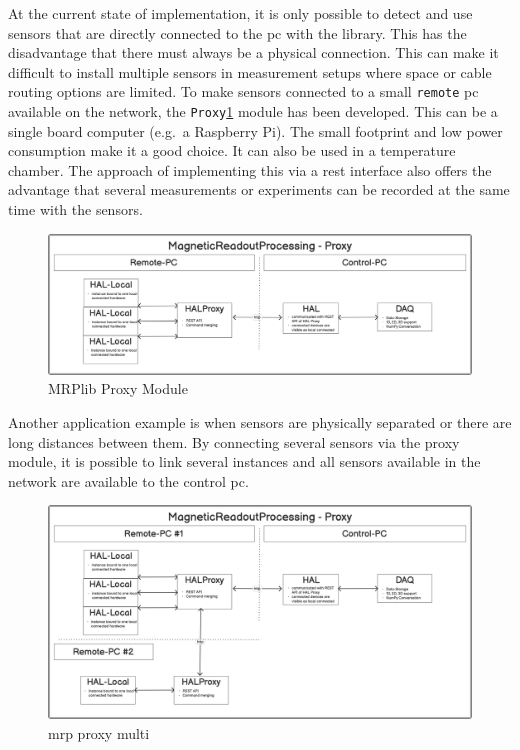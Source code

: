 At the current state of implementation, it is only possible to detect
and use sensors that are directly connected to the \gls{pc} with the
library. This has the disadvantage that there must always be a physical
connection. This can make it difficult to install multiple sensors in
measurement setups where space or cable routing options are limited. To
make sensors connected to a small \passthrough{\lstinline!remote!}
\gls{pc} available on the network, the
\passthrough{\lstinline!Proxy!}\ref{MRPlib_Proxy_Module.png} module has
been developed. This can be a single board computer (e.g.~a Raspberry
Pi). The small footprint and low power consumption make it a good
choice. It can also be used in a temperature chamber. The approach of
implementing this via a \gls{rest} interface also offers the advantage
that several measurements or experiments can be recorded at the same
time with the sensors.

\begin{figure}
\centering
\includegraphics{./generated_images/border_MRPlib_Proxy_Module.png}
\caption{MRPlib Proxy Module \label{MRPlib_Proxy_Module.png}}
\end{figure}

Another application example is when sensors are physically separated or
there are long distances between them. By connecting several sensors via
the proxy module, it is possible to link several instances and all
sensors available in the network are available to the control \gls{pc}.

\begin{figure}
\centering
\includegraphics{./generated_images/border_mrp_proxy_multi.png}
\caption{mrp proxy multi \label{mrp_proxy_multi.png}}
\end{figure}

